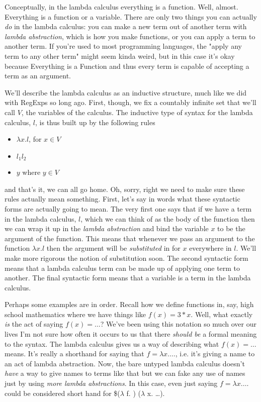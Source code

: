 \documentclass[11pt]{article}
\begin{document}
Conceptually, in the lambda calculus everything is a function. Well, almost. Everything is a function or a variable. There are only two things you can actually \emph{do} in the lambda calculus: you can make a new term out of another term with \emph{lambda abstraction}, which is how you make functions, or you can apply a term to another term. If you're used to most programming languages, the "apply any term to any other term" might seem kinda weird, but in this case it's okay because Everything is a Function and thus every term is capable of accepting a term as an argument.

We'll describe the lambda calculus as an inductive structure, much like we did with RegExps so long ago. First, though, we fix a countably infinite set that we'll call $V$, the variables of the calculus. The inductive type of syntax for the lambda calculus, $l$, is thus built up by the following rules

\begin{itemize}
\item $\lambda x. l$, for $x \in V$
\item $l_1 l_2$
\item $y$ where $y \in V$
\end{itemize}

and that's it, we can all go home. Oh, sorry, right we need to make sure these rules actually mean something. First, let's say in words what these syntactic forms are actually going to mean. The very first one says that if we have a term in the lambda calculus, $l$, which we can think of as the body of the function then we can wrap it up in the \emph{lambda abstraction} and bind the variable $x$ to be the argument of the function. This means that whenever we pass an argument to the function $\lambda x. l$ then the argument will be \emph{substituted} in for $x$ everywhere in $l$. We'll make more rigorous the notion of substitution soon. The second syntactic form means that a lambda calculus term can be made up of applying one term to another. The final syntactic form means that a variable is a term in the lambda calculus. 

Perhaps some examples are in order. Recall how we define functions in, say, high school mathematics where we have things like $f(x) = 3*x$. Well, what exactly \emph{is} the act of saying $f(x) = \ldots$? We've been using this notation so much over our lives I'm not sure how often it occurs to us that there \emph{should be} a formal meaning to the syntax. The lambda calculus gives us a way of describing what $f(x) = \ldots$ means. It's really a shorthand for saying that $f = \lambda x. \ldots$, i.e. it's giving a name to an act of lambda abstraction. Now, the bare untyped lambda calculus doesn't \emph{have} a way to give names to terms like that but we can fake any use of names just by using \emph{more lambda abstractions}. In this case, even just saying $f = \lambda x. \ldots$ could be considered short hand for \$($\lambda$ f. ) ($\lambda$ x. \ldots). 
\end{document}
